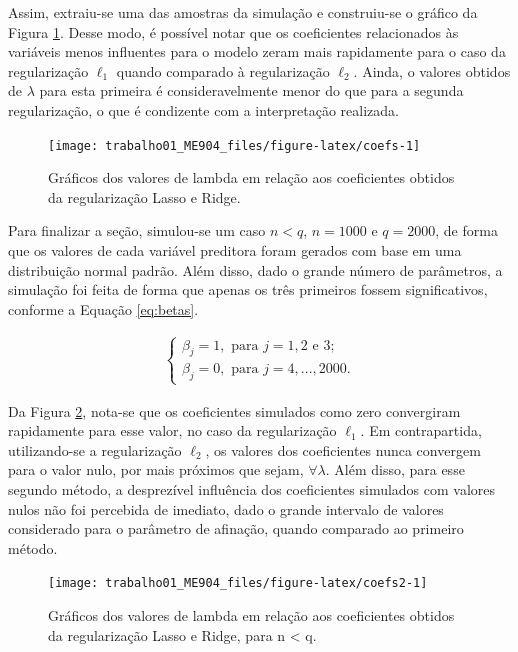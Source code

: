 \documentclass[
  12pt,
]{article}
\begin{document}
\quad Assim, extraiu-se uma das amostras da simulação e construiu-se o
gráfico da Figura \ref{fig:coefs}. Desse modo, é possível notar que os
coeficientes relacionados às variáveis menos influentes para o modelo
zeram mais rapidamente para o caso da regularização \(\ell_1\) quando
comparado à regularização \(\ell_2\). Ainda, o valores obtidos de
\(\lambda\) para esta primeira é consideravelmente menor do que para a
segunda regularização, o que é condizente com a interpretação realizada.

\begin{figure}

{\centering \texttt{[image: trabalho01\_ME904\_files/figure-latex/coefs-1]} 

}

\caption{Gráficos dos valores de lambda em relação aos coeficientes obtidos da regularização Lasso e Ridge.}\label{fig:coefs}
\end{figure}

\newpage

\quad Para finalizar a seção, simulou-se um caso \(n<q\), \(n = 1000\) e
\(q = 2000\), de forma que os valores de cada variável preditora foram
gerados com base em uma distribuição normal padrão. Além disso, dado o
grande número de parâmetros, a simulação foi feita de forma que apenas
os três primeiros fossem significativos, conforme a Equação
\ref{eq:betas}.

\begin{eqnarray}
\label{eq:betas}
\begin{cases}
\beta_j = 1, \text{ para } j = 1, 2 \text{ e } 3; \\
\beta_j = 0, \text{ para } j = 4, ..., 2000.
\end{cases}
\end{eqnarray}

\quad Da Figura \ref{fig:coefs2}, nota-se que os coeficientes simulados
como zero convergiram rapidamente para esse valor, no caso da
regularização \(\ell_1\). Em contrapartida, utilizando-se a
regularização \(\ell_2\), os valores dos coeficientes nunca convergem
para o valor nulo, por mais próximos que sejam, \(\forall \lambda\).
Além disso, para esse segundo método, a desprezível influência dos
coeficientes simulados com valores nulos não foi percebida de imediato,
dado o grande intervalo de valores considerado para o parâmetro de
afinação, quando comparado ao primeiro método.

\begin{figure}

{\centering \texttt{[image: trabalho01\_ME904\_files/figure-latex/coefs2-1]} 

}

\caption{Gráficos dos valores de lambda em relação aos coeficientes obtidos da regularização Lasso e Ridge, para n < q.}\label{fig:coefs2}
\end{figure}
\end{document}
